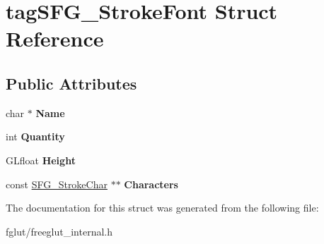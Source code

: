 \hypertarget{structtag_s_f_g___stroke_font}{}\section{tag\+S\+F\+G\+\_\+\+Stroke\+Font Struct Reference}
\label{structtag_s_f_g___stroke_font}
\subsection*{Public Attributes}
\begin{DoxyCompactItemize}
\item 
char $\ast$ {\bfseries Name}\hypertarget{structtag_s_f_g___stroke_font_a58ce3fd72340e4d477816ad751e6fe22}{}\label{structtag_s_f_g___stroke_font_a58ce3fd72340e4d477816ad751e6fe22}

\item 
int {\bfseries Quantity}\hypertarget{structtag_s_f_g___stroke_font_ade6f3c880043b67cb6e8075bb2c29b09}{}\label{structtag_s_f_g___stroke_font_ade6f3c880043b67cb6e8075bb2c29b09}

\item 
G\+Lfloat {\bfseries Height}\hypertarget{structtag_s_f_g___stroke_font_aafaad7b646988a4e8f0d0f5408c6b6de}{}\label{structtag_s_f_g___stroke_font_aafaad7b646988a4e8f0d0f5408c6b6de}

\item 
const \hyperlink{structtag_s_f_g___stroke_char}{S\+F\+G\+\_\+\+Stroke\+Char} $\ast$$\ast$ {\bfseries Characters}\hypertarget{structtag_s_f_g___stroke_font_a9c9f31c70ea2b8a55649ab5393efa0a0}{}\label{structtag_s_f_g___stroke_font_a9c9f31c70ea2b8a55649ab5393efa0a0}

\end{DoxyCompactItemize}


The documentation for this struct was generated from the following file\+:\begin{DoxyCompactItemize}
\item 
fglut/freeglut\+\_\+internal.\+h\end{DoxyCompactItemize}
